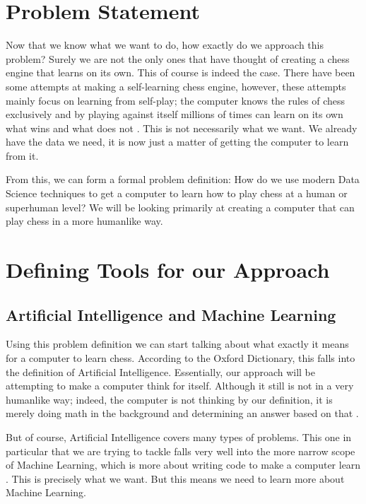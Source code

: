 \documentclass[12pt]{article}
\begin{document}
    \section{Problem Statement}

    Now that we know what we want to do, how exactly do we approach this problem? Surely we are not the only ones that have thought of creating a chess engine that learns on its own. This of course is indeed the case. There have been some attempts at making a self-learning chess engine, however, these attempts mainly focus on learning from self-play; the computer knows the rules of chess exclusively and by playing against itself millions of times can learn on its own what wins and what does not \cite{leelachess}\cite{alphazero}. This is not necessarily what we want. We already have the data we need, it is now just a matter of getting the computer to learn from it.

    From this, we can form a formal problem definition: How do we use modern Data Science techniques to get a computer to learn how to play chess at a human or superhuman level? We will be looking primarily at creating a computer that can play chess in a more humanlike way. 
    
    \section{Defining Tools for our Approach}

    \subsection{Artificial Intelligence and Machine Learning}

    Using this problem definition we can start talking about what exactly it means for a computer to learn chess. According to the Oxford Dictionary, this falls into the definition of Artificial Intelligence. Essentially, our approach will be attempting to make a computer think for itself. Although it still is not in a very humanlike way; indeed, the computer is not thinking by our definition, it is merely doing math in the background and determining an answer based on that \cite{mltypes_book}. 

    But of course, Artificial Intelligence covers many types of problems. This one in particular that we are trying to tackle falls very well into the more narrow scope of Machine Learning, which is more about writing code to make a computer learn \cite{mlprojects_netdevs}. This is precisely what we want. But this means we need to learn more about Machine Learning. 
\end{document}
